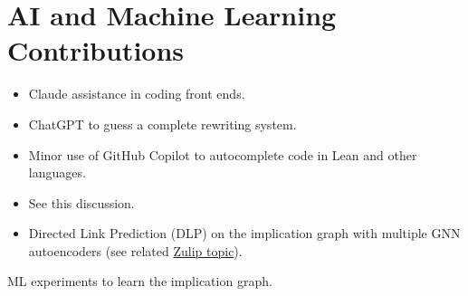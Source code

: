 \section{AI and Machine Learning Contributions}


\begin{itemize}
  \item Claude assistance in coding front ends.
  \item ChatGPT to guess a complete rewriting system.
  \item Minor use of GitHub Copilot to autocomplete code in Lean and other languages.
  \item See this discussion.
  \item Directed Link Prediction (DLP) on the implication graph with multiple GNN autoencoders
    (see related \href{https://leanprover.zulipchat.com/#narrow/channel/458659-Equational/topic/Graph.20ML.3A.20Directed.20link.20prediction.20on.20the.20implication.20graph}{Zulip topic}).
\end{itemize}

ML experiments to learn the implication graph.
